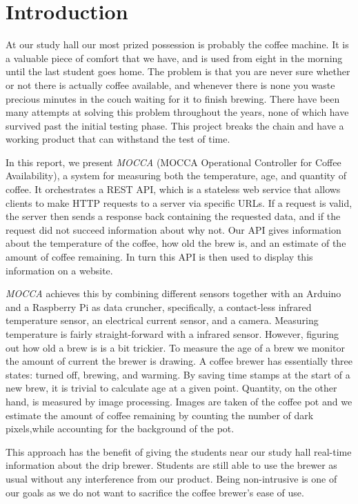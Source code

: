 \documentclass[12pt,a4paper,oneside,article]{memoir}
\numberwithin{equation}{chapter}
\begin{document}
\section{Introduction}\label{sec:introduction}
At our study hall our most prized possession is probably the coffee 
machine. It is a valuable piece of comfort that we have, and is used from eight 
in the morning until the last student goes home. The problem is that you are 
never sure whether or not there is actually coffee available, and whenever there 
is none you waste precious minutes in the couch waiting for it to finish 
brewing. There have been many attempts at solving this problem throughout the 
years, none of which have survived past the initial testing phase. This project 
breaks the chain and have a working product that can withstand the test of time.

In this report, we present \textit{MOCCA} (MOCCA Operational Controller for 
Coffee Availability), a system for measuring both the temperature, age, and 
quantity of coffee. It orchestrates a REST API, which is a stateless 
web service that allows clients to make HTTP requests to a server via 
specific URLs. If a request is valid, the server then sends a response back 
containing the requested data, and if the request did not succeed information 
about why not. Our API gives information about the temperature of the coffee, 
how old the brew is, and an estimate of the amount of coffee remaining. In turn 
this API is then used to display this information on a website.

\textit{MOCCA} achieves this by combining different sensors together with an 
Arduino and a Raspberry Pi as data cruncher, specifically, a contact-less 
infrared temperature sensor, an electrical current sensor, and a camera. 
Measuring temperature is fairly straight-forward with a infrared sensor. 
However, figuring out how old a brew is is a bit trickier. To measure the age of 
a brew we monitor the amount of current the brewer is drawing. A coffee brewer 
has essentially three states: turned off, brewing, and warming. By saving time 
stamps at the start of a new brew, it is trivial to calculate age at a given 
point. Quantity, on the other hand, is measured by image processing. Images are 
taken of the coffee pot and we estimate the amount of coffee remaining by 
counting the number of dark pixels,while accounting for the background of the 
pot.

This approach has the benefit of giving the students near our study hall 
real-time information about the drip brewer. Students are still able to use the 
brewer as usual without any interference from our product. Being non-intrusive 
is one of our goals as we do not want to sacrifice the coffee brewer's ease 
of use.
\end{document}
